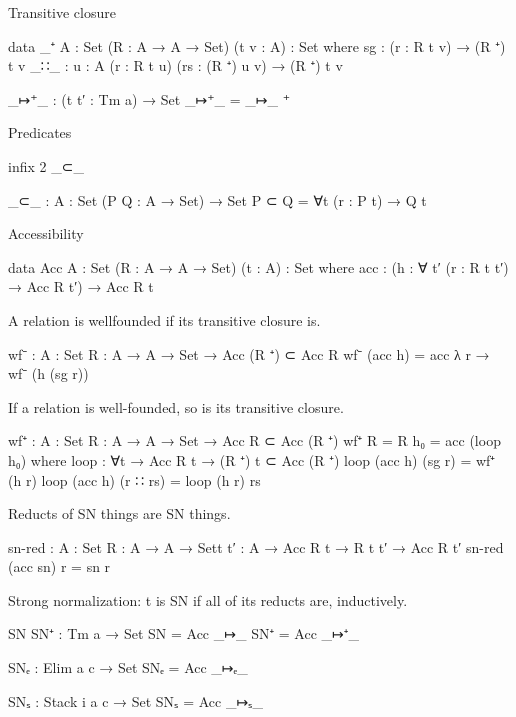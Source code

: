 Transitive closure


\begin{code}
data _⁺ {A : Set} (R : A → A → Set) (t v : A) : Set where
  sg   : (r : R t v) → (R ⁺) t v
  _∷_  : {u : A} (r : R t u) (rs : (R ⁺) u v) → (R ⁺) t v

_↦⁺_ : (t t′ : Tm a) → Set
_↦⁺_ = _↦_ ⁺
\end{code}


Predicates

\begin{code}
infix 2 _⊂_

_⊂_ : {A : Set} (P Q : A → Set) → Set
P ⊂ Q = ∀{t} (r : P t) → Q t
\end{code}

Accessibility

\begin{code}
data Acc {A : Set} (R : A → A → Set) (t : A) : Set where
  acc : (h : ∀ {t′} (r : R t t′) → Acc R t′) → Acc R t
\end{code}

A relation is wellfounded if its transitive closure is.

\begin{code}
wf⁻ : {A : Set} {R : A → A → Set} → Acc (R ⁺) ⊂ Acc R
wf⁻ (acc h) = acc λ r → wf⁻ (h (sg r))
\end{code}

If a relation is well-founded, so is its transitive closure.

\begin{code}
wf⁺ : {A : Set} {R : A → A → Set} → Acc R ⊂ Acc (R ⁺)
wf⁺ {R = R} h₀ = acc (loop h₀)
  where
  loop : ∀{t} → Acc R t → (R ⁺) t ⊂ Acc (R ⁺)
  loop (acc h) (sg r)    = wf⁺ (h r)
  loop (acc h) (r ∷ rs)  = loop (h r) rs
\end{code}

Reducts of SN things are SN things.

\begin{code}
sn-red : {A : Set} {R : A → A → Set}{t t′ : A} → Acc R t → R t t′ → Acc R t′
sn-red (acc sn) r = sn r
\end{code}

Strong normalization: t is SN if all of its reducts are, inductively.

\begin{code}
SN SN⁺ : Tm a → Set
SN   = Acc _↦_
SN⁺  = Acc _↦⁺_

SNₑ : Elim a c → Set
SNₑ = Acc _↦ₑ_

SNₛ : Stack i a c → Set
SNₛ = Acc _↦ₛ_
\end{code}

